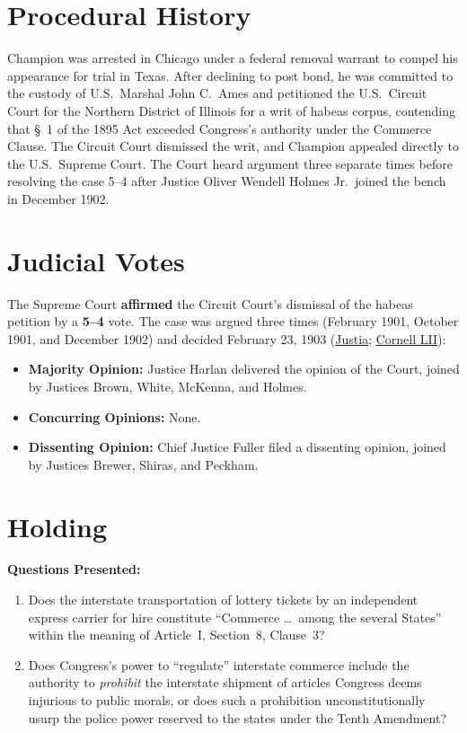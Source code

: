 \documentclass[12pt]{article}
\begin{document}
\section{Procedural History}
Champion was arrested in Chicago under a federal removal warrant to compel his appearance for trial in Texas. After declining to post bond, he was committed to the custody of U.S.\ Marshal John C.\ Ames and petitioned the U.S.\ Circuit Court for the Northern District of Illinois for a writ of habeas corpus, contending that \S~1 of the 1895 Act exceeded Congress's authority under the Commerce Clause. The Circuit Court dismissed the writ, and Champion appealed directly to the U.S.\ Supreme Court. The Court heard argument three separate times before resolving the case 5--4 after Justice Oliver Wendell Holmes Jr.\ joined the bench in December 1902.

\section{Judicial Votes}
The Supreme Court \textbf{affirmed} the Circuit Court's dismissal of the habeas petition by a \textbf{5--4} vote. The case was argued three times (February 1901, October 1901, and December 1902) and decided February 23, 1903 (\href{https://supreme.justia.com/cases/federal/us/188/321/}{Justia}; \href{https://www.law.cornell.edu/supremecourt/text/188/321}{Cornell LII}):

\begin{itemize}
    \item \textbf{Majority Opinion:} Justice Harlan delivered the opinion of the Court, joined by Justices Brown, White, McKenna, and Holmes.
    \item \textbf{Concurring Opinions:} None.
    \item \textbf{Dissenting Opinion:} Chief Justice Fuller filed a dissenting opinion, joined by Justices Brewer, Shiras, and Peckham.
\end{itemize}

\section{Holding}
\textbf{Questions Presented:}

\begin{enumerate}
  \item Does the interstate transportation of lottery tickets by an independent express carrier for hire constitute ``Commerce \dots\ among the several States'' within the meaning of Article~I, Section~8, Clause~3?
  \item Does Congress's power to ``regulate'' interstate commerce include the authority to \textit{prohibit} the interstate shipment of articles Congress deems injurious to public morals, or does such a prohibition unconstitutionally usurp the police power reserved to the states under the Tenth Amendment?
\end{enumerate}
\end{document}
